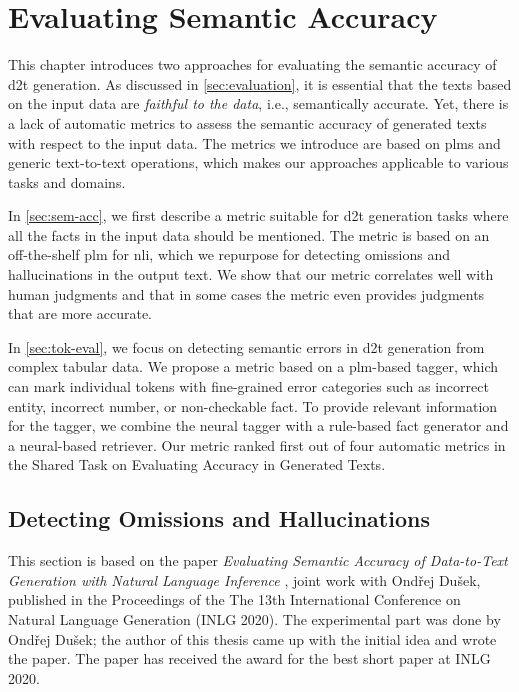 
\chapter{Evaluating Semantic Accuracy}
\label{chap:evaluation}


This chapter introduces two approaches for evaluating the semantic accuracy of \ac{d2t} generation. As discussed in \autoref{sec:evaluation}, it is essential that the texts based on the input data are \emph{faithful to the data}, i.e., semantically accurate. Yet, there is a lack of automatic metrics to assess the semantic accuracy of generated texts with respect to the input data. The metrics we introduce are based on \acp{plm} and generic text-to-text operations, which makes our approaches applicable to various tasks and domains.

In \autoref{sec:sem-acc}, we first describe a metric suitable for \ac{d2t} generation tasks where all the facts in the input data should be mentioned. The metric is based on an off-the-shelf \ac{plm} for \ac{nli}, which we repurpose for detecting omissions and hallucinations in the output text. We show that our metric correlates well with human judgments and that in some cases the metric even provides judgments that are more accurate.

In \autoref{sec:tok-eval}, we focus on detecting semantic errors in \ac{d2t} generation from complex tabular data. We propose a metric based on a \ac{plm}-based tagger, which can mark individual tokens with fine-grained error categories such as incorrect entity, incorrect number, or non-checkable fact. To provide relevant information for the tagger, we combine the neural tagger with a rule-based fact generator and a neural-based retriever. Our metric ranked first out of four automatic metrics in the Shared Task on Evaluating Accuracy in Generated Texts.

\section{Detecting Omissions and Hallucinations}
\label{sec:sem-acc}

\begin{refbox}
    This section is based on the paper \emph{Evaluating Semantic Accuracy of Data-to-Text Generation with Natural Language Inference} \cite{dusekEvaluatingSemanticAccuracy2020}, joint work with Ondřej Dušek, published in the Proceedings of the The 13th International Conference on Natural Language Generation (INLG 2020). The experimental part was done by Ondřej Dušek; the author of this thesis came up with the initial idea and wrote the paper. The paper has received the award for the best short paper at INLG 2020.
\end{refbox}

